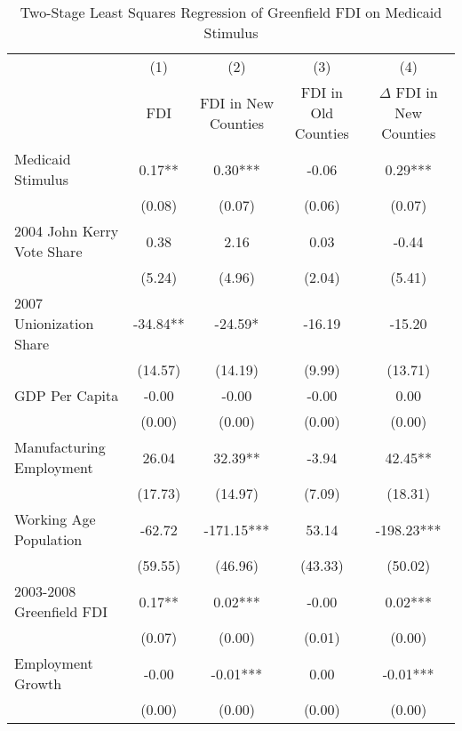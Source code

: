 \begin{table}[!htbp]\centering
\def\sym#1{\ifmmode^{#1}\else\(^{#1}\)\fi}
\caption{Two-Stage Least Squares Regression of Greenfield FDI on Medicaid Stimulus}
\begin{tabular}{l*{4}{c}}
\hline\hline
                    &\multicolumn{1}{c}{(1)}   &\multicolumn{1}{c}{(2)}   &\multicolumn{1}{c}{(3)}   &\multicolumn{1}{c}{(4)}   \\
                    &         FDI   &FDI in New Counties   &FDI in Old Counties   &$\Delta$ FDI in New Counties   \\
\hline
Medicaid Stimulus   &        0.17** &        0.30***&       -0.06   &        0.29***\\
                    &      (0.08)   &      (0.07)   &      (0.06)   &      (0.07)   \\
2004 John Kerry Vote Share&        0.38   &        2.16   &        0.03   &       -0.44   \\
                    &      (5.24)   &      (4.96)   &      (2.04)   &      (5.41)   \\
2007 Unionization Share&      -34.84** &      -24.59*  &      -16.19   &      -15.20   \\
                    &     (14.57)   &     (14.19)   &      (9.99)   &     (13.71)   \\
GDP Per Capita      &       -0.00   &       -0.00   &       -0.00   &        0.00   \\
                    &      (0.00)   &      (0.00)   &      (0.00)   &      (0.00)   \\
Manufacturing Employment&       26.04   &       32.39** &       -3.94   &       42.45** \\
                    &     (17.73)   &     (14.97)   &      (7.09)   &     (18.31)   \\
Working Age Population&      -62.72   &     -171.15***&       53.14   &     -198.23***\\
                    &     (59.55)   &     (46.96)   &     (43.33)   &     (50.02)   \\
2003-2008 Greenfield FDI&        0.17** &        0.02***&       -0.00   &        0.02***\\
                    &      (0.07)   &      (0.00)   &      (0.01)   &      (0.00)   \\
Employment Growth   &       -0.00   &       -0.01***&        0.00   &       -0.01***\\
                    &      (0.00)   &      (0.00)   &      (0.00)   &      (0.00)   \\

\end{tabular}
\end{table}
